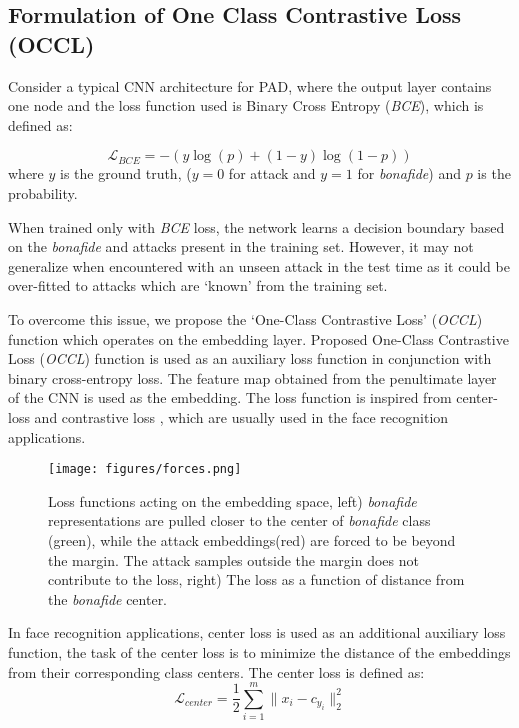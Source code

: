\documentclass[journal]{IEEEtran}
\begin{document}
\subsection{Formulation of One Class Contrastive Loss (OCCL)}

Consider a typical CNN architecture for PAD, where the output layer contains one node and the loss function used is  Binary Cross Entropy (\textit{BCE}), which is defined as:

\begin{equation}
\mathcal{L}_{BCE}=-{(y\log(p) + (1 - y)\log(1 - p))}
\end{equation}
where $y$ is the ground truth, ($y=0$ for attack and $y=1$ for \textit{bonafide}) and $p$ is the probability.

When trained only with \textit{BCE} loss, the network learns a decision boundary based on the \textit{bonafide} and attacks present in the training set. However, it may not generalize when encountered with an unseen attack in the test time as it could be over-fitted to attacks which are `known' from the training set.

To overcome this issue, we propose the `One-Class Contrastive Loss' (\textit{OCCL}) function which operates on the embedding layer. Proposed One-Class Contrastive Loss (\textit{OCCL}) function is used as an auxiliary loss function in conjunction with binary cross-entropy loss. The feature map obtained from the penultimate layer of the CNN is used as the embedding. The loss function is inspired from  center-loss \cite{wen2016discriminative} and contrastive loss \cite{hadsell2006dimensionality}, which are usually used in the face recognition applications.

\begin{figure}[ht!]
     \centering
         \texttt{[image: figures/forces.png]}
\caption{Loss functions acting on the embedding space, left) \textit{bonafide} representations are pulled closer to the center of \textit{bonafide} class (green), while the attack embeddings(red) are forced to be beyond the margin. The attack samples outside the margin does not contribute to the loss, right) The loss as a function of distance from the \textit{bonafide} center.}
\label{fig:embedding_force}
\end{figure}

In face recognition applications, center loss is used as an additional auxiliary loss function, the task of the center loss is to minimize the distance of the embeddings from their corresponding class centers. The center loss is defined as:
\begin{equation}
\mathcal{L}_{center}=\frac{1}{2}\sum_{i=1}^m \|x_i-c_{y_i}\|_2^2
\end{equation}
\end{document}
